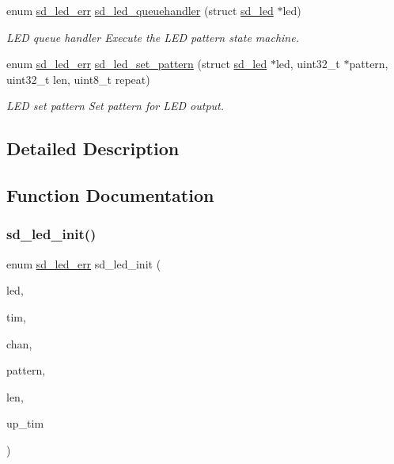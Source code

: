 \begin{DoxyCompactItemize}
enum \mbox{\hyperlink{group___s_d___l_e_d___types_ga4f347a1003b4089de88a7f0fc62c1071}{sd\+\_\+led\+\_\+err}} \mbox{\hyperlink{group___s_d___l_e_d___functions_gaecada14301da813355742b77525b6ebc}{sd\+\_\+led\+\_\+queuehandler}} (struct \mbox{\hyperlink{structsd__led}{sd\+\_\+led}} $\ast$led)
\begin{DoxyCompactList}\small\item\em L\+ED queue handler Execute the L\+ED pattern state machine. \end{DoxyCompactList}\item 
enum \mbox{\hyperlink{group___s_d___l_e_d___types_ga4f347a1003b4089de88a7f0fc62c1071}{sd\+\_\+led\+\_\+err}} \mbox{\hyperlink{group___s_d___l_e_d___functions_ga5641c6ed41cf81ecbd2d61731a412667}{sd\+\_\+led\+\_\+set\+\_\+pattern}} (struct \mbox{\hyperlink{structsd__led}{sd\+\_\+led}} $\ast$led, uint32\+\_\+t $\ast$pattern, uint32\+\_\+t len, uint8\+\_\+t repeat)
\begin{DoxyCompactList}\small\item\em L\+ED set pattern Set pattern for L\+ED output. \end{DoxyCompactList}\end{DoxyCompactItemize}


\subsection{Detailed Description}


\subsection{Function Documentation}
\mbox{\label{group___s_d___l_e_d___functions_ga06e51b91e36bfe8becb0e977ae6d9035}} 
\subsubsection{\texorpdfstring{sd\+\_\+led\+\_\+init()}{sd\_led\_init()}}
{\footnotesize\ttfamily enum \mbox{\hyperlink{group___s_d___l_e_d___types_ga4f347a1003b4089de88a7f0fc62c1071}{sd\+\_\+led\+\_\+err}} sd\+\_\+led\+\_\+init (\begin{DoxyParamCaption}\item[{struct \mbox{\hyperlink{structsd__led}{sd\+\_\+led}} $\ast$}]{led,  }\item[{T\+I\+M\+\_\+\+Handle\+Type\+Def $\ast$}]{tim,  }\item[{uint32\+\_\+t}]{chan,  }\item[{uint32\+\_\+t $\ast$}]{pattern,  }\item[{uint32\+\_\+t}]{len,  }\item[{T\+I\+M\+\_\+\+Handle\+Type\+Def $\ast$}]{up\+\_\+tim }\end{DoxyParamCaption})}



